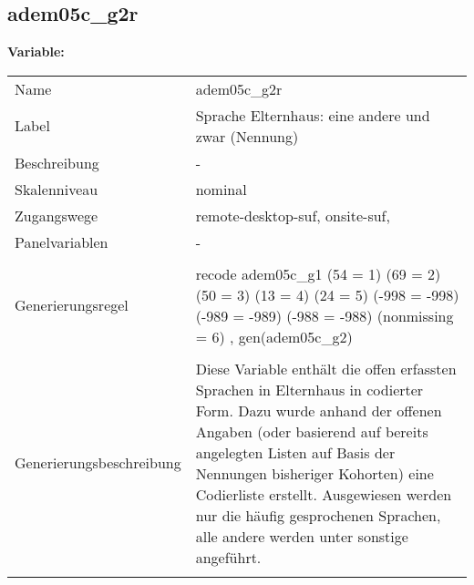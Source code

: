 	
	
	\subsection{adem05c\_g2r}
	\label{subSection:adem05c_g2r}

	\noindent\textbf{Variable:}\\
		\begin{tabular}{lL{11.3cm}}
			\label{tableVariable:adem05c_g2r}
			Name & adem05c\_g2r \\
			Label & Sprache Elternhaus: eine andere und zwar (Nennung) \\
			Beschreibung & - \\
			Skalenniveau & nominal \\
			Zugangswege &
				remote-desktop-suf,
				onsite-suf,
 \\
			Panelvariablen & -
			 \\
			 \\
					Generierungsregel & recode adem05c\_g1 (54 = 1) (69 = 2) (50 = 3) (13 = 4)
(24 = 5) (-998 = -998) (-989 = -989) (-988 = -988) 
(nonmissing = 6) , gen(adem05c\_g2) \\
				 \\
					Generierungsbeschreibung & Diese Variable enthält die offen erfassten Sprachen in Elternhaus in codierter Form. Dazu wurde anhand der offenen Angaben (oder basierend auf bereits angelegten Listen auf Basis der Nennungen bisheriger Kohorten) eine Codierliste erstellt. Ausgewiesen werden nur die häufig gesprochenen Sprachen, alle andere werden unter sonstige angeführt.
				 \\	
			 \\
		\end{tabular}






